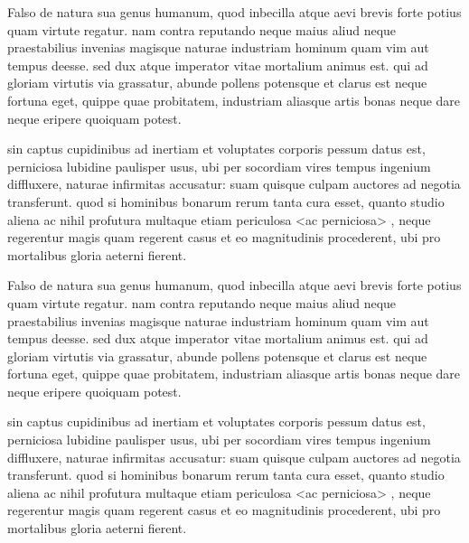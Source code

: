 \documentclass{article}
\begin{document}
\begin{pages}
  \begin{Leftside}
\beginnumbering

\pstart Falso  de natura sua genus humanum, quod inbecilla atque aevi brevis forte potius quam virtute regatur. nam contra reputando neque maius aliud neque praestabilius invenias magisque naturae industriam hominum quam vim aut tempus deesse. sed dux atque imperator vitae mortalium animus est. qui  ad gloriam virtutis via grassatur, abunde pollens potensque et clarus est neque fortuna eget, quippe quae probitatem, industriam aliasque artis bonas neque dare neque eripere quoiquam potest. \pend

\pstart sin captus  cupidinibus ad inertiam et voluptates corporis pessum datus est, perniciosa lubidine paulisper usus, ubi per socordiam vires tempus ingenium diffluxere, naturae infirmitas accusatur: suam quisque culpam auctores ad negotia transferunt. quod si hominibus bonarum rerum tanta cura esset, quanto studio aliena ac nihil profutura multaque etiam periculosa <ac perniciosa> , neque regerentur magis quam regerent casus et eo magnitudinis procederent, ubi pro mortalibus gloria aeterni fierent.  \pend

\endnumbering
  \end{Leftside}
  \begin{Rightside}
\beginnumbering

\pstart Falso  de natura sua genus humanum, quod inbecilla atque aevi brevis forte potius quam virtute regatur. nam contra reputando neque maius aliud neque praestabilius invenias magisque naturae industriam hominum quam vim aut tempus deesse. sed dux atque imperator vitae mortalium animus est. qui  ad gloriam virtutis via grassatur, abunde pollens potensque et clarus est neque fortuna eget, quippe quae probitatem, industriam aliasque artis bonas neque dare neque eripere quoiquam potest. \pend

\pstart sin captus  cupidinibus ad inertiam et voluptates corporis pessum datus est, perniciosa lubidine paulisper usus, ubi per socordiam vires tempus ingenium diffluxere, naturae infirmitas accusatur: suam quisque culpam auctores ad negotia transferunt. quod si hominibus bonarum rerum tanta cura esset, quanto studio aliena ac nihil profutura multaque etiam periculosa <ac perniciosa> , neque regerentur magis quam regerent casus et eo magnitudinis procederent, ubi pro mortalibus gloria aeterni fierent.  \pend

\endnumbering
  \end{Rightside}
\end{pages}

\Pages
\end{document}

